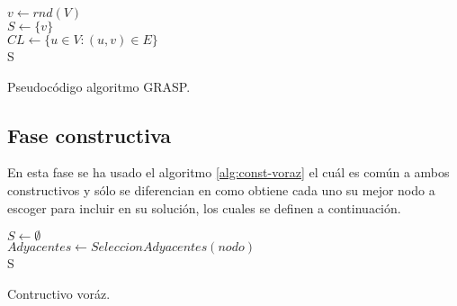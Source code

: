 \begin{algorithm}
	\SetAlgoLined
	$ v \gets rnd( V ) $ \\[0.2cm]
	$ S \gets \{ v \} $ \\[0.2cm]
	$ CL \gets \{u \in V : (u, v) \in E\} $ \\[0.2cm]
	\Return S
	\caption{Pseudocódigo algoritmo GRASP.}
	\label{alg:grasp}
\end{algorithm}

\subsection{Fase constructiva}

En esta fase se ha usado el algoritmo \ref{alg:const-voraz} el cuál es común a ambos constructivos y sólo se diferencian en como obtiene cada uno su mejor nodo a escoger para incluir en su solución, los cuales se definen a continuación.\\

\begin{algorithm}
	\SetAlgoLined
	$ S \gets \emptyset $  \\[0.2cm]
	$ Adyacentes \gets  SeleccionAdyacentes(nodo) $  \\[0.2cm]
	\Return S
	\caption{Contructivo voráz.}
	\label{alg:const-voraz}
\end{algorithm}

